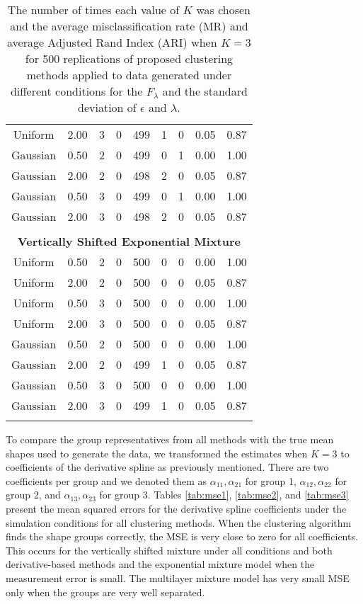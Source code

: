 \begin{table}[ht]
\begin{center}
\begin{tabular}{ccc|cccccc}
  Uniform & 2.00 &   3 & 0 & 499 & 1 & 0 & 0.05 & 0.87 \\ 
  Gaussian & 0.50 &   2 & 0 & 499 & 0 & 1 & 0.00 & 1.00 \\ 
  Gaussian & 2.00 &   2 & 0 & 498 & 2 & 0 & 0.05 & 0.87 \\ 
  Gaussian & 0.50 &   3 & 0 & 499 & 0 & 1 & 0.00 & 1.00 \\ 
  Gaussian & 2.00 &   3 & 0 & 498 & 2 & 0 & 0.05 & 0.87 \\ 
   \\ \multicolumn{9}{c}{\textbf{Vertically Shifted Exponential Mixture}}\\Uniform & 0.50 &   2 & 0 & 500 & 0 & 0 & 0.00 & 1.00 \\ 
  Uniform & 2.00 &   2 & 0 & 500 & 0 & 0 & 0.05 & 0.87 \\ 
  Uniform & 0.50 &   3 & 0 & 500 & 0 & 0 & 0.00 & 1.00 \\ 
  Uniform & 2.00 &   3 & 0 & 500 & 0 & 0 & 0.05 & 0.87 \\ 
  Gaussian & 0.50 &   2 & 0 & 500 & 0 & 0 & 0.00 & 1.00 \\ 
  Gaussian & 2.00 &   2 & 0 & 499 & 1 & 0 & 0.05 & 0.87 \\ 
  Gaussian & 0.50 &   3 & 0 & 500 & 0 & 0 & 0.00 & 1.00 \\ 
  Gaussian & 2.00 &   3 & 0 & 499 & 1 & 0 & 0.05 & 0.87 \\ 
   \thickhline\end{tabular}
\caption{The number of times each value of $K$ was chosen and the average misclassification rate (MR) and average Adjusted Rand Index (ARI) when $K=3$ for 500 replications of proposed clustering methods applied to data generated under different conditions for the $F_{\lambda}$ and the standard deviation of $\epsilon$ and $\lambda$.}
\label{tab:freq3}
\end{center}
\end{table}
To compare the group representatives from all methods with the true mean shapes used to generate the data, we transformed the estimates when $K=3$ to coefficients of the derivative spline as previously mentioned. There are two coefficients per group and we denoted them as $\alpha_{11},\alpha_{21}$ for group 1, $\alpha_{12},\alpha_{22}$ for group 2, and $\alpha_{13},\alpha_{23}$ for group 3. Tables \ref{tab:mse1}, \ref{tab:mse2}, and \ref{tab:mse3} present the mean squared errors for the derivative spline coefficients under the simulation conditions for all clustering methods. When the clustering algorithm finds the shape groups correctly, the MSE is very close to zero for all coefficients. This occurs for the vertically shifted mixture under all conditions and both derivative-based methods and the exponential mixture model when the measurement error is small. The multilayer mixture model has very small MSE only when the groups are very well separated.

